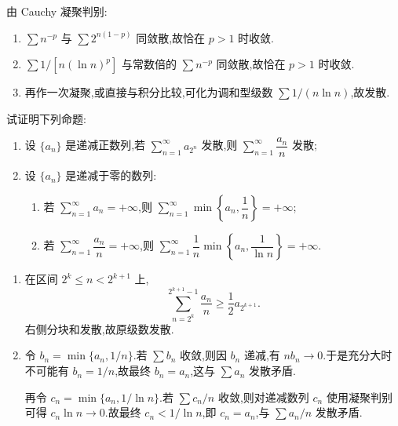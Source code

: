 \begin{solution}
    由 Cauchy 凝聚判别:
    \begin{enumerate}
        \item $\displaystyle \sum n^{-p}$ 与 $\displaystyle \sum2^{n(1-p)}$ 同敛散,故恰在 $p>1$ 时收敛.
        \item $\displaystyle \sum1/[n(\ln n)^p]$ 与常数倍的 $\displaystyle \sum n^{-p}$ 同敛散,故恰在 $p>1$ 时收敛.
        \item 再作一次凝聚,或直接与积分比较,可化为调和型级数
              $\displaystyle \sum1/(n\ln n)$,故发散.
    \end{enumerate}
\end{solution}

\begin{example}
    试证明下列命题:
    \begin{enumerate}
        \item 设 $\{a_n\}$ 是递减正数列,若 $\displaystyle\sum\limits_{n=1}^{\infty}a_{2^n}$ 发散,则 $\displaystyle\sum\limits_{n=1}^{\infty}\dfrac{a_n}{n}$ 发散;
        \item 设 $\{a_n\}$ 是递减于零的数列:
              \begin{enumerate}[label=(\roman*)]
                  \item 若 $\displaystyle\sum\limits_{n=1}^{\infty}a_n=+\infty$,则 $\displaystyle\sum\limits_{n=1}^{\infty}\min\left\{a_n,\dfrac{1}{n}\right\}=+\infty$;
                  \item 若 $\displaystyle\sum\limits_{n=1}^{\infty}\dfrac{a_n}{n}=+\infty$,则 $\displaystyle\sum\limits_{n=1}^{\infty}\dfrac{1}{n}\min\left\{a_n,\dfrac{1}{\ln n}\right\}=+\infty$.
              \end{enumerate}
    \end{enumerate}
\end{example}
\exampleblank

\begin{solution}
    \leavevmode
    \begin{enumerate}
        \item 在区间 $2^k\leq n<2^{k+1}$ 上,
              \[
                  \displaystyle\sum\limits_{n=2^k}^{2^{k+1}-1}\dfrac{a_n}{n}
                  \geq\dfrac{1}{2}a_{2^{k+1}}.
              \]
              右侧分块和发散,故原级数发散.
        \item 令 $b_n=\min\{a_n,1/n\}$.若 $\displaystyle \sum b_n$ 收敛,则因 $b_n$ 递减,有 $nb_n\to0$.于是充分大时不可能有 $b_n=1/n$,故最终 $b_n=a_n$,这与 $\displaystyle \sum a_n$ 发散矛盾.

              再令 $c_n=\min\{a_n,1/\ln n\}$.若 $\displaystyle \sum c_n/n$ 收敛,则对递减数列 $c_n$ 使用凝聚判别可得 $c_n\ln n\to0$.故最终 $c_n<1/\ln n$,即 $c_n=a_n$,与 $\displaystyle \sum a_n/n$ 发散矛盾.
    \end{enumerate}
\end{solution}

